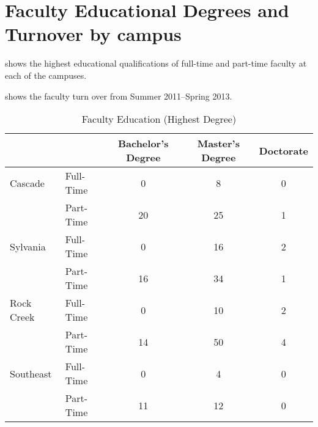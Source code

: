 \chapter{Faculty Educational Degrees and Turnover by campus}\label{app:sec:facultyDegrees}

 shows the highest educational 
qualifications of full-time and part-time faculty at each of the campuses.

 shows the faculty turn over from 
Summer 2011--Spring 2013.

\begin{table}[!htb]
	\centering
	\caption{Faculty Education (Highest Degree)}
	\label{app:tab:facultyDegrees}
	\begin{tabular}{ll*{3}{S}}
		\toprule
		 & & {Bachelor's Degree} & {Master's Degree} & {Doctorate} \\
		\midrule
		Cascade    & Full-Time & 0  & 8  & 0 \\
		           & Part-Time & 20 & 25 & 1 \\
		Sylvania   & Full-Time & 0  & 16 & 2 \\
		           & Part-Time & 16 & 34 & 1 \\
		Rock Creek & Full-Time & 0  & 10 & 2 \\
		           & Part-Time & 14 & 50 & 4 \\
		Southeast & Full-Time & 0  & 4 & 0 \\
		           & Part-Time & 11 & 12 & 0 \\
		\bottomrule
	\end{tabular}
\end{table}

